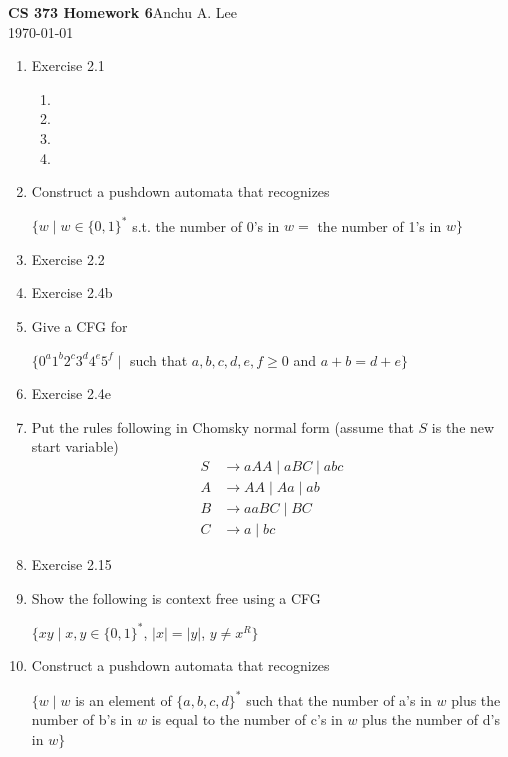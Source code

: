 \documentclass{article}
\begin{document}
    \noindent\textbf{CS 373 Homework 6}\hfill Anchu A. Lee\\
    \noindent\today\\
    \begin{enumerate}
        \item Exercise 2.1
            \begin{enumerate}[label =\alph*.]
                \item 
                \item 
                \item 
                \item 
            \end{enumerate}
        
        \item Construct a pushdown automata that recognizes 
            \begin{center}
                $\{w\mid w \in \{0,1\}^* $ s.t. the number of 0's in $ w = $ the number of 1's in $ w \}$
            \end{center}
        
        \item Exercise 2.2

        \item Exercise 2.4b

        \item Give a CFG for
            \begin{center}
                $\{0^a1^b2^c3^d4^e5^f \mid $ such that $ a,b,c,d,e,f\geq 0 $ and $ a+b=d+e \}$
            \end{center}
        
        \item Exercise 2.4e

        \item Put the rules following in Chomsky normal form (assume that $S$ is the new start variable)
            \begin{align*}
                S&\rightarrow aAA \mid aBC \mid abc\\
                A&\rightarrow AA \mid Aa \mid ab\\
                B&\rightarrow aaBC \mid BC\\
                C&\rightarrow a\mid bc
            \end{align*}
        
        \item Exercise 2.15

        \item Show the following is context free using a CFG
            \begin{center}
                $\{xy \mid x,y\in \{0,1\}^*$, $ |x|=|y|$, $ y\not= x^R\}$
            \end{center}

        \item Construct a pushdown automata that recognizes
            \begin{center}
                $\{w\mid w $ is an element of $\{a,b,c,d\}^* $ such that the number of a's in $w$ plus the number of b's in $w$ is equal to the number of c's in $w$ plus the number of d's in $w \}$
            \end{center}
    \end{enumerate}
\end{document}
